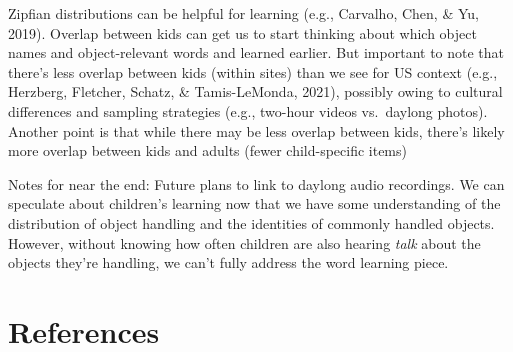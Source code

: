 \documentclass[10pt, letterpaper]{article}
\begin{document}
Zipfian distributions can be helpful for learning (e.g., Carvalho, Chen,
\& Yu, 2019). Overlap between kids can get us to start thinking about
which object names and object-relevant words and learned earlier. But
important to note that there's less overlap between kids (within sites)
than we see for US context (e.g., Herzberg, Fletcher, Schatz, \&
Tamis-LeMonda, 2021), possibly owing to cultural differences and
sampling strategies (e.g., two-hour videos vs.~daylong photos). Another
point is that while there may be less overlap between kids, there's
likely more overlap between kids and adults (fewer child-specific items)

Notes for near the end: Future plans to link to daylong audio
recordings. We can speculate about children's learning now that we have
some understanding of the distribution of object handling and the
identities of commonly handled objects. However, without knowing how
often children are also hearing \emph{talk} about the objects they're
handling, we can't fully address the word learning piece.

\hypertarget{references}{%
\section{References}\label{references}}

\setlength{\parindent}{-0.1in} 
\setlength{\leftskip}{0.125in}

\noindent
\end{document}
